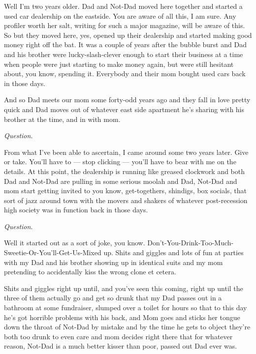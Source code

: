 Well I'm two years older. Dad and Not-Dad moved here together
and started a used car dealership on the eastside. You are aware of
all this, I am sure. Any profiler worth her salt, writing for such
a major magazine, will be aware of this. So but they moved here,
yes, opened up their dealership and started making good money right
off the bat. It was a couple of years after the bubble burst and
Dad and his brother were lucky-slash-clever enough to start their
business at a time when people were just starting to make money
again, but were still hesitant about, you know, spending it.
Everybody and their mom bought used cars back in those days.

And so Dad meets our mom some forty-odd years ago and they fall in
love pretty quick and Dad moves out of whatever east side apartment
he's sharing with his brother at the time, and in with
mom.



{\em Question}.



From what I've been able to ascertain, I came around some two
years later. Give or take. You'll have to --- stop
clicking --- you'll have to bear with me on the details.
At this point, the dealership is running like greased clockwork and
both Dad and Not-Dad are pulling in some serious moolah and Dad,
Not-Dad and mom start getting invited to you know, get-togethers,
shindigs, box socials, that sort of jazz around town with the
movers and shakers of whatever post-recession high society was in
function back in those days.



{\em Question}.



Well it started out as a sort of joke, you know.
Don't-You-Drink-Too-Much-Sweetie-Or-You'll-Get-Us-Mixed
up. Shits and giggles and lots of fun at parties with my Dad and
his brother showing up in identical suits and my mom pretending to
accidentally kiss the wrong clone et cetera.

Shits and giggles right up until, and you've seen this
coming, right up until the three of them actually go and get so
drunk that my Dad passes out in a bathroom at some fundraiser,
slumped over a toilet for hours so that to this day he's got
horrible problems with his back, and Mom goes and sticks her tongue
down the throat of Not-Dad by mistake and by the time he gets to
object they're both too drunk to even care and mom decides
right there that for whatever reason, Not-Dad is a much better
kisser than poor, passed out Dad ever was.




